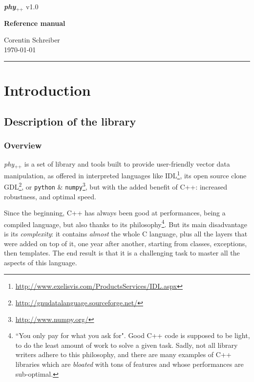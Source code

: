 \documentclass[12pt]{report}
\newcommand{\phypp}{\textit{phy}$_{\text{++}}$\xspace}
\begin{document}
\begin{titlepage}

{\noindent \Huge \textbf{\phypp} \Large v1.0 \\[0.6cm]} \par
\noindent
\vspace{2cm}
\begin{center}
\Huge \textbf{Reference manual}
\end{center}
\null\vfill
\vspace*{1cm}
\hfill
\begin{minipage}{0.35\linewidth}
    \begin{flushright}
        \large Corentin Schreiber \\
        \today
    \end{flushright}
\end{minipage}
%
\begin{minipage}{0.02\linewidth}
    \rule{1pt}{40pt}
\end{minipage}
\end{titlepage}

\tableofcontents

\chapter{Introduction \label{SEC:intro}}

\section{Description of the library \label{SEC:intro:overview}}

\subsection{Overview}

\phypp is a set of library and tools built to provide user-friendly vector data manipulation, as offered in interpreted languages like IDL\footnote{\url{http://www.exelisvis.com/ProductsServices/IDL.aspx}}, its open source clone GDL\footnote{\url{http://gnudatalanguage.sourceforge.net/}}, or \texttt{python} \& \texttt{numpy}\footnote{\url{http://www.numpy.org/}}, but with the added benefit of C++: increased robustness, and optimal speed.

Since the beginning, C++ has always been good at performances, being a compiled language, but also thanks to its philosophy\footnote{``You only pay for what you ask for". Good C++ code is supposed to be light, to do the least amount of work to solve a given task. Sadly, not all library writers adhere to this philosophy, and there are many examples of C++ libraries which are \emph{bloated} with tons of features and whose performances are sub-optimal.}. But its main disadvantage is its \emph{complexity}: it contains \emph{almost} the whole C language, plus all the layers that were added on top of it, one year after another, starting from classes, exceptions, then templates. The end result is that it is a challenging task to master all the aspects of this language.
\end{document}
